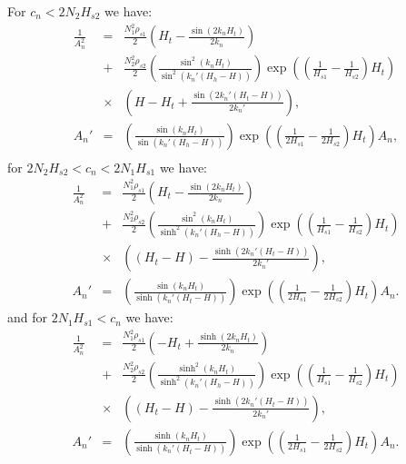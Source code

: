 \documentclass[a4paper,10pt]{article}
\begin{document}
For $c_n<2N_2H_{s2}$ we have:
%
\begin{eqnarray}
\label{case1_An}
\frac{1}{A_n^2}    & = &  \frac{N_1^2 \rho_{s1}}{2} \left( H_t - \frac{\sin(2 k_n H_t)}{ 2 k_n }  \right) \\ \nonumber
                            & + & \frac{N_2^2 \rho_{s2} }{2} \left(  \frac{ \sin^2(k_n H_t)}{ \sin^2( k_n ' (H_h - H) )} \right) \exp \left(  \left( \frac{1}{H_{s1} } - \frac{1}{H_{s2}} \right) H_t \right) \\ \nonumber
                            & \times & \left( H - H_t + \frac{\sin( 2 k_n ' (H_t - H))}{ 2 k_n ' } \right), \\ \nonumber
A_n '                    & = & \left( \frac{ \sin(k_n H_t)}{ \sin( k_n ' (H_h - H) )} \right) \exp \left(  \left( \frac{1}{2H_{s1} } - \frac{1}{2 H_{s2}} \right) H_t \right) A_n, \\ \nonumber
\end{eqnarray}
%
for $2 N_2 H_{s2} < c_n  < 2 N_1 H_{s1}$ we have:
%
\begin{eqnarray}
\label{case2_An}
\frac{1}{A_n^2}    & = & \frac{N_1^2 \rho_{s1} }{2}\left( H_t - \frac{\sin( 2 k_n H_t ) }{ 2 k_n }  \right) \\ \nonumber
                            & + & \frac{N_2^2 \rho_{s2} }{2} \left(  \frac{ \sin^2(k_n H_t)}{\sinh^2( k_n ' (H_h - H) )} \right)  \exp \left( \left( \frac{1}{H_{s1}} - \frac{1}{H_{s2}} \right) H_t \right) \\ \nonumber
                            & \times & \left( (H_t - H) - \frac{\sinh (2k_n ' (H_t - H))}{ 2 k_n ' } \right), \\ \nonumber
A_n '                    & =  &\left( \frac{ \sin (k_n H_t)}{ \sinh( k_n ' (H_t - H) )} \right) \exp \left( \left( \frac{1}{2 H_{s1}} - \frac{1}{2 H_{s2}} \right) H_t \right) A_n.
\end{eqnarray}
%
and for $2 N_1 H_{s1} < c_n$ we have:
%
\begin{eqnarray}
\label{case3_An}
\frac{1}{A_n^2}    & = & \frac{N_1^2 \rho_{s1} }{2}\left( - H_t + \frac{\sinh( 2 k_n H_t ) }{ 2 k_n }  \right) \\ \nonumber
                            & + & \frac{N_2^2 \rho_{s2} }{2} \left(  \frac{ \sinh^2(k_n H_t)}{\sinh^2( k_n ' (H_h - H) )} \right)  \exp \left( \left( \frac{1}{H_{s1}} - \frac{1}{H_{s2}} \right) H_t \right) \\ \nonumber
                            & \times & \left( (H_t - H) - \frac{\sinh (2 k_n ' (H_t - H))}{ 2 k_n ' } \right), \\ \nonumber
A_n '                    & =  &\left( \frac{ \sinh (k_n H_t)}{ \sinh( k_n ' (H_t - H) )} \right) \exp \left( \left( \frac{1}{2 H_{s1}} - \frac{1}{2 H_{s2}} \right) H_t \right) A_n.
\end{eqnarray}
%
\end{document}
